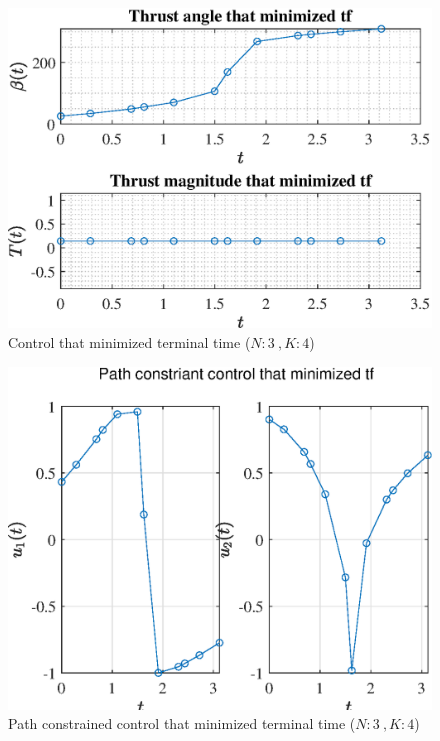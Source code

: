 \documentclass[]{article}
\begin{document}
	\begin{figure}
		\centering
		\includegraphics[scale=0.75]{control_N3_K4_C3_tf.eps}
		\caption{Control that minimized terminal time (\(N:3\ , K:4\))}
		\label{fig:control_N3_K4_C3_tf}
	\end{figure}
	\begin{figure}
		\centering
		\includegraphics[scale=0.75]{path_N3_K4_C3_tf.eps}
		\caption{Path constrained control that minimized terminal time (\(N:3\ , K:4\))}
		\label{fig:path_N3_K4_C3_tf}
	\end{figure}
\end{document}
